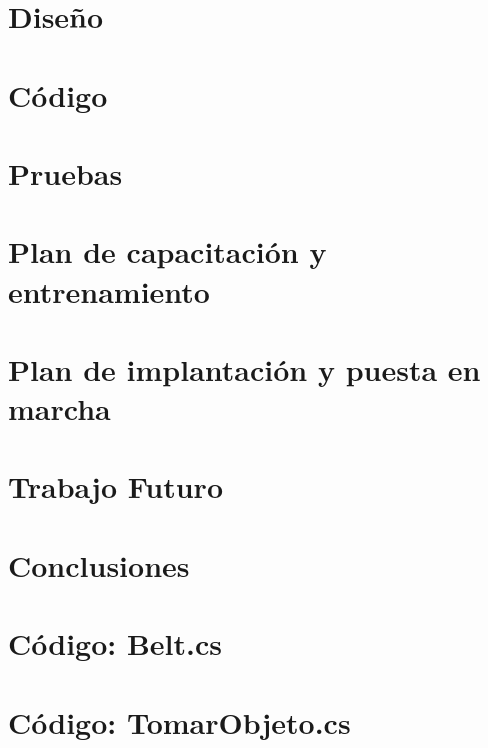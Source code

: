 \documentclass[final,letterpaper,oneside,authoryear,11pt,singlespace,spanish]{ezthesis}
\begin{document}
\chapter{Diseño} 
\chapter{Código} 
\chapter{Pruebas} 
\chapter{Plan de capacitación y entrenamiento} 
\chapter{Plan de implantación y puesta en marcha} 
\chapter{Trabajo Futuro} 
\chapter{Conclusiones} 



\appendix
\chapter{Código: Belt.cs} 
\chapter{Código: TomarObjeto.cs} 
\end{document}
